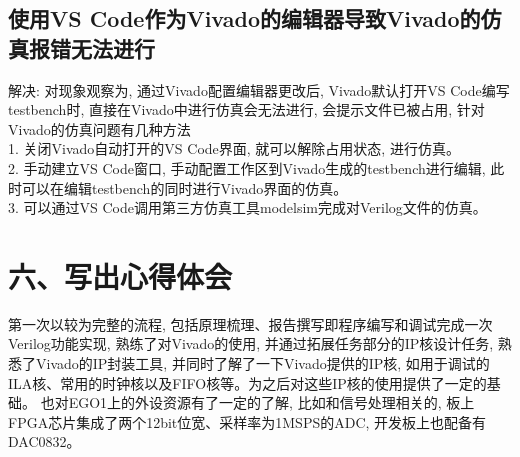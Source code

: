 \documentclass{article}
\newcommand{\fourhao}{\fontsize{14pt}{\baselineskip}\selectfont} %
\newcommand{\xiaosihao}{\fontsize{12pt}{\baselineskip}\selectfont} %
\begin{document}
\subsection*{使用VS Code作为Vivado的编辑器导致Vivado的仿真报错无法进行}
解决: 对现象观察为, 通过Vivado配置编辑器更改后, Vivado默认打开VS Code编写testbench时, 直接在Vivado中进行仿真会无法进行, 会提示文件已被占用, 
针对Vivado的仿真问题有几种方法\\
1. 关闭Vivado自动打开的VS Code界面, 就可以解除占用状态, 进行仿真。\\
2. 手动建立VS Code窗口, 手动配置工作区到Vivado生成的testbench进行编辑, 此时可以在编辑testbench的同时进行Vivado界面的仿真。\\
3. 可以通过VS Code调用第三方仿真工具modelsim完成对Verilog文件的仿真。\\
\section*{\fourhao 六、写出心得体会}
\xiaosihao
第一次以较为完整的流程, 包括原理梳理、报告撰写即程序编写和调试完成一次Verilog功能实现, 熟练了对Vivado的使用, 
并通过拓展任务部分的IP核设计任务, 熟悉了Vivado的IP封装工具, 并同时了解了一下Vivado提供的IP核, 如用于调试的ILA核、常用的时钟核以及FIFO核等。为之后对这些IP核的使用提供了一定的基础。
也对EGO1上的外设资源有了一定的了解, 比如和信号处理相关的, 板上FPGA芯片集成了两个12bit位宽、采样率为1MSPS的ADC, 开发板上也配备有DAC0832。\\
\end{document}
